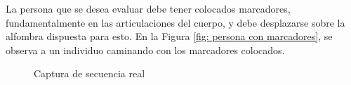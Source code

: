La persona que se desea evaluar debe tener colocados marcadores, fundamentalmente en las articulaciones del cuerpo, y debe desplazarse sobre la alfombra dispuesta para esto. En la Figura \ref{fig: persona con marcadores}, se observa a un individuo caminando con los marcadores colocados.

\begin{figure}[ht!]		
        \hspace{0.1cm}
  \caption{Captura de secuencia real}
      \label{fig: captura real}
\end{figure}


